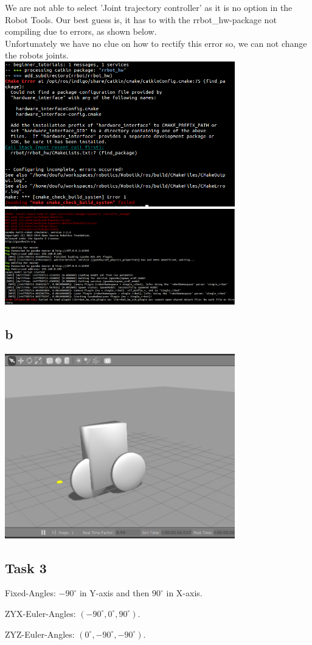 We are not able to select 'Joint trajectory controller' as it is no option in the Robot Tools.
Our best guess is, it has to with the rrbot\_hw-package not compiling due to errors, as shown below.\\
Unfortunately we have no clue on how to rectify this error so, we can not change the robots joints.\\
\includegraphics[width=0.75\textwidth]{img/screen_ue4_t2_a_1-fail.png}\\
\includegraphics[width=0.75\textwidth]{img/screen_ue4_t2_a_2-fail.png}


\subsection{b}\label{ass4_t2b}

\includegraphics[width=0.75\textwidth]{img/screen_ue4_t2_b.png}

\subsection{Task 3}\label{ass4_t3}

Fixed-Angles: $- 90^\circ$ in Y-axis and then $90^\circ$ in X-axis.

\noindent ZYX-Euler-Angles: $(-90^\circ, 0^\circ, 90^\circ)$.

\noindent ZYZ-Euler-Angles: $(0^\circ, -90^\circ, -90^\circ)$.